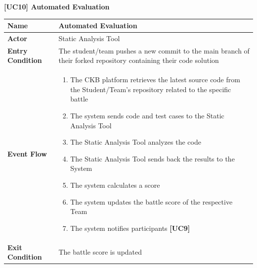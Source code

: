 \documentclass{article}
\begin{document}
\begin{table}
 \renewcommand{\arraystretch}{1.5}
    \centering
    \raggedright\textbf{[UC10] Automated Evaluation}
    \begin{tabular}{|l|p{10cm}|}
        \hline
        \textbf{Name} & Automated Evaluation \\
        \hline
        \textbf{Actor} & Static Analysis Tool \\
        \hline
        \textbf{Entry Condition} & The student/team pushes a new commit to the main branch of their forked repository containing their code solution\\
        \hline
        \textbf{Event Flow} & 
        \begin{enumerate}[align=left, topsep=0pt, partopsep=0pt]
            \item The CKB platform retrieves the latest source code from the Student/Team's repository related to the specific battle
            \item The system sends code and test cases to the Static Analysis Tool 
            \item The Static Analysis Tool analyzes the code 
            \item The Static Analysis Tool sends back the results to the System
            \item The system calculates a score
            \item The system updates the battle score of the respective Team
            \item The system notifies participants \textbf{[UC9]}
        \end{enumerate} \\
        \hline
        \textbf{Exit Condition} & The battle score is updated \\
        \hline
    \end{tabular}
\end{table}
\end{document}
